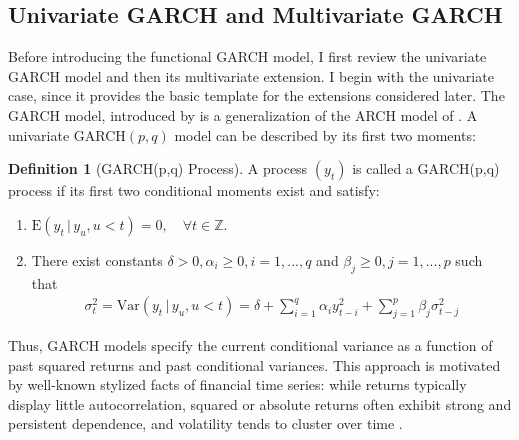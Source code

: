 \documentclass[12pt,a4paper]{article}
\theoremstyle{definition}
\newtheorem{definition}{Definition}[section]
\begin{document}
\subsection{Univariate GARCH and Multivariate GARCH}
\label{subsec:ScalarGARCH}
Before introducing the functional GARCH model, I first review the univariate GARCH model and then its multivariate extension. I begin with the univariate case, since it provides the basic template for the extensions considered later. The GARCH model, introduced by \citet{Bollerslev1986} is a generalization of the ARCH model of \citet{Engle1982}. A univariate GARCH$(p,q)$ model can be described by its first two moments:
\begin{definition}[GARCH(p,q) Process]
    A process $(y_t)$ is called a GARCH(p,q) process if its first two conditional moments exist and satisfy:
    \begin{enumerate}
        \item $\mathrm{E}(y_t \,|\, y_u,u<t)=0, \quad \forall t\in\mathbb{Z}$.
        \item There exist constants $\delta>0,\alpha_i\ge 0,i=1,...,q$ and $\beta_j\ge0,j=1,...,p$ such that
        \begin{align}
            \sigma_t^2=\mathrm{Var}(y_t\,|\,y_u,u<t)=\delta+\sum_{i=1}^q\alpha_iy_{t-i}^2+\sum_{j=1}^p\beta_j\sigma_{t-j}^2
        \end{align}
    \end{enumerate}
\end{definition}
Thus, GARCH models specify the current conditional variance as a function of past squared returns and past conditional variances. This approach is motivated by well-known stylized facts of financial time series: while returns typically display little autocorrelation, squared or absolute returns often exhibit strong and persistent dependence, and volatility tends to cluster over time \citep{mandelbrot1963variation,taylor2011asset}.
\end{document}
